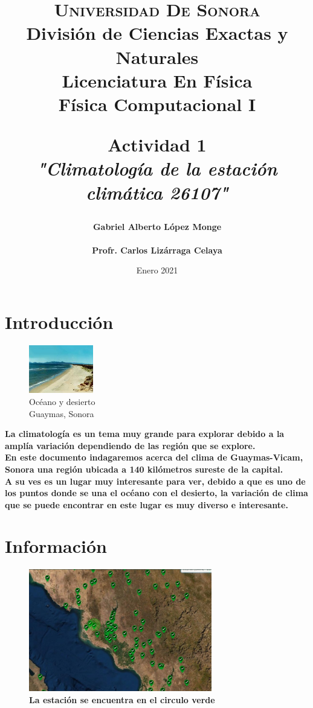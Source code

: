 \documentclass{article}
\title{ 
\LARGE \textsc{\textbf{Universidad De Sonora}} \\ \bigskip
\Large\textbf{ División de Ciencias Exactas y Naturales} \\
\textbf{Licenciatura En Física} \\ \bigskip
\bigskip
\textbf{Física Computacional I} \\ \bigskip

\Large \textbf{{Actividad 1}} \\ \bigskip
\textit{\textbf{"Climatología de la estación climática 26107"}}}
\author{
\Large\textbf{ Gabriel Alberto López Monge} \\ \bigskip
\\ \bigskip
\Large\textbf{ Profr. Carlos Lizárraga Celaya}}
\date{Enero 2021}
\begin{document}
\maketitle

\newpage
\section{\LARGE Introducción}
\begin{figure} 
\caption{Océano y desierto 
\\ Guaymas, Sonora }
    \centering
    \includegraphics[width=0.25\textwidth]{1.jpg}
\end{figure}
 \large\textbf{La climatología es un tema muy grande para explorar debido a la amplía variación dependiendo de las región que se explore.
 \\ En este documento indagaremos acerca del clima de Guaymas-Vicam, Sonora una región ubicada a 140 kilómetros sureste de la capital.
 \\ A su ves es un lugar muy interesante para ver, debido a que es uno de los puntos donde se una el océano con el desierto, la variación de clima que se puede encontrar en este lugar es muy diverso e interesante.}
 
 \section{\LARGE Información}
 
\begin{figure}[h]
\includegraphics[width=8cm]{2.jpg} 
\\ \large\textbf{La estación se encuentra en el circulo verde}
\end{figure}
\end{document}
